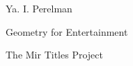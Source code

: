 

\maketitle
\cleardoublepage
\thispagestyle{empty}
\begin{center}

{\LARGE Ya. I. Perelman}

{\Huge Geometry for Entertainment}




The Mir Titles Project

\end{center}
\cleardoublepage

\thispagestyle{empty}
\vfill


